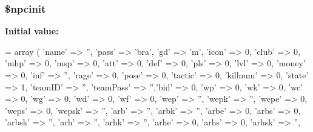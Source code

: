 \hypertarget{addnpc__1_8php_a38bd0e87b769bab492d83ad186789abd}{
\subsubsection[{\$npcinit}]{\setlength{\rightskip}{0pt plus 5cm}\$npcinit}}\label{addnpc__1_8php_a38bd0e87b769bab492d83ad186789abd}
{\bfseries Initial value\+:}
\begin{DoxyCode}
= array
    (
        \textcolor{stringliteral}{'name'} => \textcolor{stringliteral}{''},   \textcolor{stringliteral}{'pass'} => \textcolor{stringliteral}{'bra'}, \textcolor{stringliteral}{'gd'} => \textcolor{charliteral}{'m'},   \textcolor{stringliteral}{'icon'} => 0,    \textcolor{stringliteral}{'club'} => 0,    
        \textcolor{stringliteral}{'mhp'} => 0, \textcolor{stringliteral}{'msp'} => 0, \textcolor{stringliteral}{'att'} => 0, \textcolor{stringliteral}{'def'} => 0, \textcolor{stringliteral}{'pls'} => 0, \textcolor{stringliteral}{'lvl'} => 0,
        \textcolor{stringliteral}{'money'} => 0,   \textcolor{stringliteral}{'inf'} => \textcolor{stringliteral}{''},    \textcolor{stringliteral}{'rage'} => 0,    \textcolor{stringliteral}{'pose'} => 0,    \textcolor{stringliteral}{'tactic'} => 0,  
        \textcolor{stringliteral}{'killnum'} => 0, \textcolor{stringliteral}{'state'} => 1,   \textcolor{stringliteral}{'teamID'} => \textcolor{stringliteral}{''}, \textcolor{stringliteral}{'teamPass'} => \textcolor{stringliteral}{''},\textcolor{stringliteral}{'bid'} => 0,
        \textcolor{stringliteral}{'wp'} => 0, \textcolor{stringliteral}{'wk'} => 0, \textcolor{stringliteral}{'wc'} => 0, \textcolor{stringliteral}{'wg'} => 0, \textcolor{stringliteral}{'wd'} => 0, \textcolor{stringliteral}{'wf'} => 0,
        \textcolor{stringliteral}{'wep'} => \textcolor{stringliteral}{''},    \textcolor{stringliteral}{'wepk'} => \textcolor{stringliteral}{''},   \textcolor{stringliteral}{'wepe'} => 0,    \textcolor{stringliteral}{'weps'} => 0,    \textcolor{stringliteral}{'wepsk'} => \textcolor{stringliteral}{''},
        \textcolor{stringliteral}{'arb'} => \textcolor{stringliteral}{''},    \textcolor{stringliteral}{'arbk'} => \textcolor{stringliteral}{''},   \textcolor{stringliteral}{'arbe'} => 0,    \textcolor{stringliteral}{'arbs'} => 0,    \textcolor{stringliteral}{'arbsk'} => \textcolor{stringliteral}{''},
        \textcolor{stringliteral}{'arh'} => \textcolor{stringliteral}{''},    \textcolor{stringliteral}{'arhk'} => \textcolor{stringliteral}{''},   \textcolor{stringliteral}{'arhe'} => 0,    \textcolor{stringliteral}{'arhs'} => 0,    \textcolor{stringliteral}{'arhsk'} => \textcolor{stringliteral}{''},

\end{DoxyCode}
